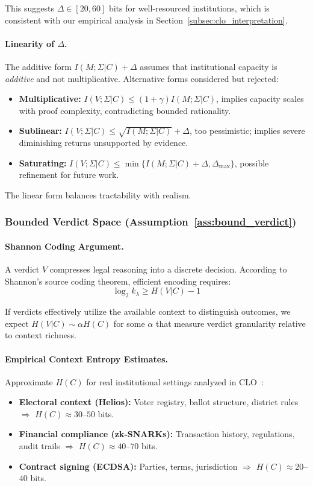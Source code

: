 \documentclass{ieeeaccess}
\begin{document}
This suggests $\Delta \in [20, 60]$ bits for well-resourced institutions, which is consistent with our empirical analysis in Section~\ref{subsec:clo_interpretation}.

\paragraph{Linearity of $\Delta$.}
The additive form $I(M;\Sigma|C) + \Delta$ assumes that institutional capacity is \emph{additive} and not multiplicative. Alternative forms considered but rejected:
\begin{itemize}
\item \textbf{Multiplicative:} $I(V;\Sigma|C) \leq (1+\gamma) I(M;\Sigma|C)$, implies capacity scales with proof complexity, contradicting bounded rationality.
\item \textbf{Sublinear:} $I(V;\Sigma|C) \leq \sqrt{I(M;\Sigma|C)} + \Delta$, too pessimistic; implies severe diminishing returns unsupported by evidence.
\item \textbf{Saturating:} $I(V;\Sigma|C) \leq \min\{I(M;\Sigma|C) + \Delta, \Delta_{\max}\}$, possible refinement for future work.
\end{itemize}

The linear form balances tractability with realism.

\subsubsection{Bounded Verdict Space (Assumption~\ref{ass:bound_verdict})}

\paragraph{Shannon Coding Argument.}
A verdict $V$ compresses legal reasoning into a discrete decision. According to Shannon's source coding theorem, efficient encoding requires:
\begin{equation}
\log_2 k_\lambda \geq H(V|C) - 1
\end{equation}

If verdicts effectively utilize the available context to distinguish outcomes, we expect $H(V|C) \sim \alpha H(C)$ for some $\alpha$ that measure verdict granularity relative to context richness.

\paragraph{Empirical Context Entropy Estimates.}
Approximate $H(C)$ for real institutional settings analyzed in CLO~\cite{Minka2026CLO}:
\begin{itemize}
\item \textbf{Electoral context (Helios):} Voter registry, ballot structure, district rules $\Rightarrow$ $H(C) \approx 30$--$50$ bits.
\item \textbf{Financial compliance (zk-SNARKs):} Transaction history, regulations, audit trails $\Rightarrow$ $H(C) \approx 40$--$70$ bits.
\item \textbf{Contract signing (ECDSA):} Parties, terms, jurisdiction $\Rightarrow$ $H(C) \approx 20$--$40$ bits.
\end{itemize}
\end{document}
